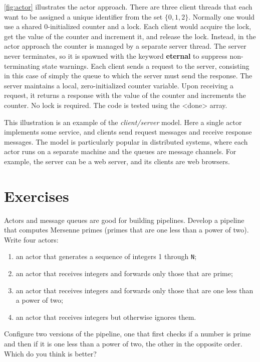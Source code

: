 \documentclass{report}
\begin{document}
{\autoref{fig:actor} illustrates the actor approach.
There are three client threads that each want to be assigned
a unique identifier from the set $\{ 0, 1, 2 \}$.
Normally one would use a shared 0-initialized counter and a lock.
Each client would acquire the lock, get the value of the counter
and increment it, and release the lock.
Instead, in the actor approach the counter is managed by a
separate server thread.
The server never terminates, so it is spawned with the keyword
\textbf{eternal} to suppress non-terminating state warnings.
Each client sends a request to the server, consisting in this case
of simply the queue to which the server must send the response.
The server maintains a local, zero-initialized counter variable.
Upon receiving a request, it returns a response with the value of
the counter and increments the counter.  No lock is required.
The code is tested using the <{done}> array.

This illustration is an example of the \emph{client/server} model.
Here a single actor implements some service, and clients send request
messages and receive response messages.  The model is particularly
popular in distributed systems, where each actor runs on a separate
machine and the queues are message channels.  For example, the server
can be a web server, and its clients are web browsers.

\section*{Exercises}
\begin{problems}
\item Actors and message queues are good for building pipelines.
Develop a pipeline that computes Mersenne primes (primes that are one less
than a power of two).  Write four actors:
\begin{enumerate}
\item an actor that generates a sequence of integers 1 through \texttt{N};
\item an actor that receives integers and forwards only those that are prime;
\item an actor that receives integers and forwards only those that are one
less than a power of two;
\item an actor that receives integers but otherwise ignores them.
\end{enumerate}
Configure two versions of the pipeline, one that first checks if a number
is prime and then if it is one less than a power of two, the other
in the opposite order.  Which do you think is better?
\end{problems}

}
\end{document}
